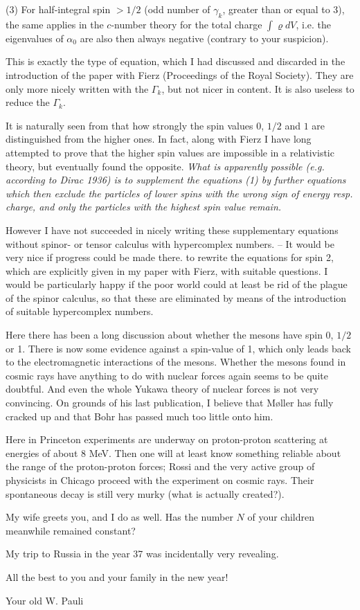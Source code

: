 (3) For half-integral spin $> 1/2$ (odd number of $\gamma_k$, greater than or equal to 3), the same applies in the $c$-number theory for the total charge $\int\varrho{dV}$, i.e. the eigenvalues of $\alpha_0$ are also then always negative (contrary to your suspicion).

This is exactly the type of equation, which I had discussed and discarded in the introduction of the paper with Fierz (Proceedings of the Royal Society). They are only more nicely written with the $\Gamma_k$, but not nicer in content. It is also useless to reduce the $\Gamma_k$.

It is naturally seen from that how strongly the spin values $0$, $1/2$ and $1$ are distinguished from the higher ones. In fact, along with Fierz I have long attempted to prove that the higher spin values are impossible in a relativistic theory, but eventually found the opposite. \textit{What is apparently possible (e.g. according to Dirac 1936) is to supplement the equations (1) by further equations which then exclude the particles of lower spins with the wrong sign of energy resp. charge, and only the particles with the highest spin value remain.}

However I have not succeeded in nicely writing these supplementary equations without spinor- or tensor calculus with hypercomplex numbers.  -- It would be very nice if progress could be made there.  to rewrite the equations for spin 2, which are explicitly given in my paper with Fierz, with suitable questions. I would be particularly happy if the poor world could at least be rid of the plague of the spinor calculus, so that these are eliminated by means of the introduction of suitable hypercomplex numbers.

Here there has been a long discussion about whether the mesons have spin 0, $1/2$ or 1. There is now some evidence against a spin-value of 1, which only leads back to the electromagnetic interactions of the mesons. Whether the mesons found in cosmic rays have anything to do with nuclear forces again seems to be quite doubtful. And even the whole Yukawa theory of nuclear forces is not very convincing. On grounds of his last publication, I believe that Møller has fully cracked up and that Bohr has passed much too little onto him.

Here in Princeton experiments are underway on proton-proton scattering at energies of about 8 MeV. Then one will at least know something reliable about the range of the proton-proton forces; Rossi and the very active group of physicists in Chicago proceed with the experiment on cosmic rays. Their spontaneous decay is still very murky (what is actually created?).

My wife greets you, and I do as well. Has the number $N$ of your children meanwhile remained constant?

My trip to Russia in the year 37 was incidentally very revealing.

All the best to you and your family in the new year!

Your old W. Pauli


